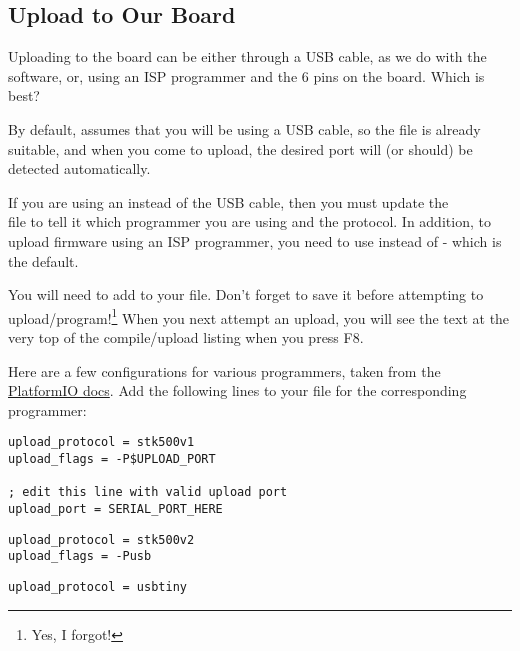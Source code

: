 \subsection{Upload to Our Board}\label{upload-to-our-board}

Uploading to the board can be either through a USB cable, as we do with the   software, or, using an ISP programmer and the 6 pins on the   board. Which is best?

By default,  assumes that you will be using a USB cable, so the file  is already suitable, and when you come to upload, the desired port will (or should) be detected automatically.

If you are using an  instead of the USB cable, then you must update the\\  file to tell it which programmer you are using and the protocol. In addition, to upload firmware using an ISP programmer, you need to use  instead of  - which is the default. 

You will need to add  to your  file. Don't forget to save it before attempting to upload/program!\footnote{Yes, I forgot!} When you next attempt an upload, you will see the text  at the very top of the compile/upload listing when you press F8.


Here are a few configurations for various programmers, taken from the \href{http://docs.platformio.org/en/latest/platforms/atmelavr.html?highlight=usbtiny#upload-using-programmer}{PlatformIO docs}. Add the following lines to your  file for the corresponding programmer:

\begin{lstlisting}[caption={The \inline{platformio.ini} additions for `AVRISP' ISP Programmer}]
upload_protocol = stk500v1
upload_flags = -P$UPLOAD_PORT

; edit this line with valid upload port
upload_port = SERIAL_PORT_HERE
\end{lstlisting}


\begin{lstlisting}[caption={The \inline{platformio.ini} additions for `AVRISP MkII' Programmer}]
upload_protocol = stk500v2
upload_flags = -Pusb
\end{lstlisting}


\begin{lstlisting}[caption={The \inline{platformio.ini} additions for `USBTinyISP' Programmer}]
upload_protocol = usbtiny
\end{lstlisting}


